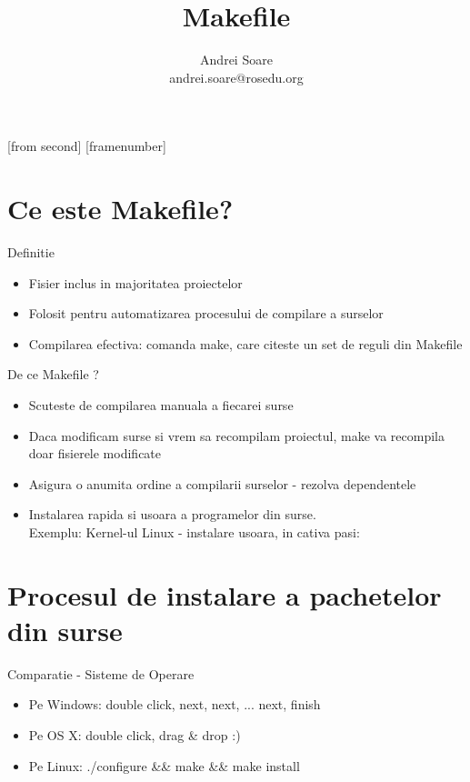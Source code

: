 \documentclass{beamer}
\title[Makefile]{Makefile}
\institute{ROSEdu}
\author{Andrei Soare\\{\footnotesize andrei.soare@rosedu.org}}
\begin{document}
[from second]
[framenumber]

\frame{\titlepage}

\frame{\tableofcontents}

\section{Ce este Makefile?}
    \frame{\tableofcontents[currentsection]}
    
    \begin{frame}{Definitie}
    \begin{itemize}
    \setlength{\itemsep}{0.8cm}
    \item Fisier inclus in majoritatea proiectelor
    \item Folosit pentru automatizarea procesului de compilare a surselor
    \item Compilarea efectiva: comanda make, care citeste un set de reguli din Makefile
    \end{itemize}
    \end{frame}

    \begin{frame}{De ce Makefile ?}
    \begin{itemize}
    \setlength{\itemsep}{0.4cm}
    \item Scuteste de compilarea manuala a fiecarei surse
    \item Daca modificam surse si vrem sa recompilam proiectul, make va recompila doar fisierele modificate
    \item Asigura o anumita ordine a compilarii surselor - rezolva dependentele
    \item Instalarea rapida si usoara a programelor din surse.\\Exemplu: Kernel-ul Linux - instalare usoara, in cativa pasi:\\\vspace{0.2cm}
    \end{itemize}
    \end{frame}

\section{Procesul de instalare a pachetelor din surse}
    \frame{\tableofcontents[currentsection]}

    \begin{frame}{Comparatie - Sisteme de Operare}
    \begin{itemize}
    \setlength{\itemsep}{0.5cm}
    \item Pe Windows: double click, next, next, ... next, finish
    \item Pe OS X: double click, drag \& drop :)
    \item Pe Linux: \ttfamily./configure \&\& make \&\& make install\normalfont
    \end{itemize}
    \end{frame}
\end{document}
